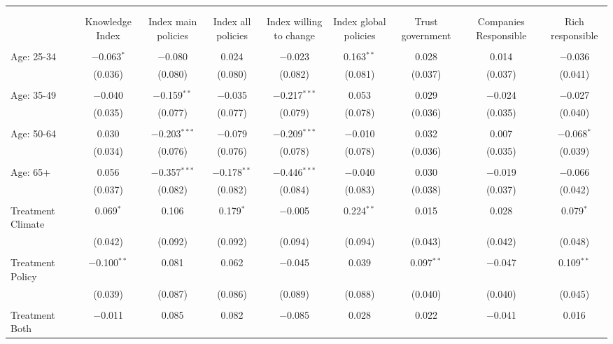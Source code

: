 
\begin{tabular}{@{\extracolsep{5pt}}lcccccccc} 
\\[-1.8ex]\hline 
\hline \\[-1.8ex] 
\\[-1.8ex] & Knowledge Index & Index main policies & Index all policies & Index willing to change & Index global policies & Trust government & Companies Responsible & Rich responsible \\ 
\hline \\[-1.8ex] 
 Age: 25-34 & $-$0.063$^{*}$ & $-$0.080 & 0.024 & $-$0.023 & 0.163$^{**}$ & 0.028 & 0.014 & $-$0.036 \\ 
  & (0.036) & (0.080) & (0.080) & (0.082) & (0.081) & (0.037) & (0.037) & (0.041) \\ 
  & & & & & & & & \\ 
 Age: 35-49 & $-$0.040 & $-$0.159$^{**}$ & $-$0.035 & $-$0.217$^{***}$ & 0.053 & 0.029 & $-$0.024 & $-$0.027 \\ 
  & (0.035) & (0.077) & (0.077) & (0.079) & (0.078) & (0.036) & (0.035) & (0.040) \\ 
  & & & & & & & & \\ 
 Age: 50-64 & 0.030 & $-$0.203$^{***}$ & $-$0.079 & $-$0.209$^{***}$ & $-$0.010 & 0.032 & 0.007 & $-$0.068$^{*}$ \\ 
  & (0.034) & (0.076) & (0.076) & (0.078) & (0.078) & (0.036) & (0.035) & (0.039) \\ 
  & & & & & & & & \\ 
 Age: 65+ & 0.056 & $-$0.357$^{***}$ & $-$0.178$^{**}$ & $-$0.446$^{***}$ & $-$0.040 & 0.030 & $-$0.019 & $-$0.066 \\ 
  & (0.037) & (0.082) & (0.082) & (0.084) & (0.083) & (0.038) & (0.037) & (0.042) \\ 
  & & & & & & & & \\ 
 Treatment Climate & 0.069$^{*}$ & 0.106 & 0.179$^{*}$ & $-$0.005 & 0.224$^{**}$ & 0.015 & 0.028 & 0.079$^{*}$ \\ 
  & (0.042) & (0.092) & (0.092) & (0.094) & (0.094) & (0.043) & (0.042) & (0.048) \\ 
  & & & & & & & & \\ 
 Treatment Policy & $-$0.100$^{**}$ & 0.081 & 0.062 & $-$0.045 & 0.039 & 0.097$^{**}$ & $-$0.047 & 0.109$^{**}$ \\ 
  & (0.039) & (0.087) & (0.086) & (0.089) & (0.088) & (0.040) & (0.040) & (0.045) \\ 
  & & & & & & & & \\ 
 Treatment Both & $-$0.011 & 0.085 & 0.082 & $-$0.085 & 0.028 & 0.022 & $-$0.041 & 0.016 \\ 

\end{tabular}
